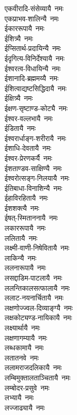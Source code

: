 \begin{multicols}{2}
\begin{flushleft}
एकवीरादि-संसेव्यायै~नमः\\
एकप्राभव-शालिन्यै~नमः\hfill {}\\
ईकाररूपायै~नमः\\
ईशित्र्यै~नमः\\
ईप्सितार्थ-प्रदायिन्यै~नमः\\
ईदृगित्य-विनिर्देश्यायै~नमः\\
ईश्वरत्व-विधायिन्यै~नमः\\
ईशानादि-ब्रह्ममय्यै~नमः\\
ईशित्वाद्यष्टसिद्धिदायै~नमः\\
ईक्षित्र्यै~नमः\\
ईक्षण-सृष्टाण्ड-कोट्यै~नमः\\
ईश्वर-वल्लभायै~नमः\hfill {}\\
ईडितायै~नमः\\
ईश्वरार्धाङ्ग-शरीरायै~नमः\\
ईशाधि-देवतायै~नमः\\
ईश्वर-प्रेरणकर्यै~नमः\\
ईशताण्डव-साक्षिण्यै~नमः\\
ईश्वरोत्सङ्ग-निलयायै~नमः\\
ईतिबाधा-विनाशिन्यै~नमः\\
ईहाविरहितायै~नमः\\
ईशशक्त्यै~नमः\\
ईषत्-स्मिताननायै~नमः\hfill {}\\
लकाररूपायै~नमः\\
ललितायै~नमः\\
लक्ष्मी-वाणी-निषेवितायै~नमः\\
लाकिन्यै~नमः\\
ललनारूपायै~नमः\\
लसद्दाडिम-पाटलायै~नमः\\
ललन्तिकालसत्फालायै~नमः\\
ललाट-नयनार्चितायै~नमः\\
लक्षणोज्ज्वल-दिव्याङ्ग्यै~नमः\\
लक्षकोट्यण्ड-नायिकायै~नमः\hfill {}\\
लक्ष्यार्थायै~नमः\\
लक्षणागम्यायै~नमः\\
लब्धकामायै~नमः\\
लतातनवे~नमः\\
ललामराजदलिकायै~नमः\\
लम्बिमुक्तालताञ्चितायै~नमः\\
लम्बोदर-प्रसुवे~नमः\\
लभ्यायै~नमः\\
लज्जाढ्यायै~नमः\\

\end{flushleft}
\end{multicols}
